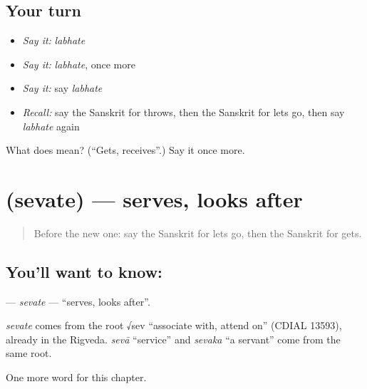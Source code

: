 \subsection*{Your turn}
\begin{itemize}
\raggedright
  \item \emph{Say it:} \emph{labhate}
  \item \emph{Say it:} \emph{labhate}, once more
  \item \emph{Say it:} say \emph{labhate}
  \item \emph{Recall:} say the Sanskrit for throws, then the Sanskrit for lets go, then say \emph{labhate} again
\end{itemize}

\begin{tcolorbox}[breakable,colback=teal!4,colframe=teal!35!black,title={Before you move on}]
What does  mean? (\textquotedblleft{}Gets, receives\textquotedblright{}.) Say it once more.
\end{tcolorbox}
\section[\texorpdfstring{\sk{सेवते} (sevate)}{सेवते (sevate)}]{ (sevate) — serves, looks after}

\label{lesson:SA-C173-sevate}



\begin{quote}
Before the new one: say the Sanskrit for lets go, then the Sanskrit for gets.
\end{quote}

\subsection*{You'll want to know: }
\textbf{} — \emph{sevate} — \textquotedblleft{}serves, looks after\textquotedblright{}.

\begin{cousinweb}
\emph{sevate} comes from the root √sev \textquotedblleft{}associate with, attend on\textquotedblright{} (CDIAL 13593), already in the Rigveda. \emph{sevā} \textquotedblleft{}service\textquotedblright{} and \emph{sevaka} \textquotedblleft{}a servant\textquotedblright{} come from the same root.
\end{cousinweb}

\begin{grammarlens}[title={What you've built}]
One more word for this chapter.
\end{grammarlens}

